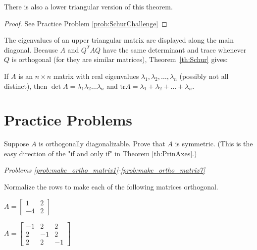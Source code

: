 \documentclass{ximera}
\begin{document}
\begin{remark}There is also a lower triangular version of this theorem.
\end{remark}

\begin{proof}
See Practice Problem \ref{prob:SchurChallenge}
\end{proof}

The eigenvalues of an upper triangular matrix are displayed along the main diagonal. Because $A$ and $Q^{T}AQ$ have the same determinant and trace whenever $Q$ is orthogonal (for they are similar matrices), Theorem~\ref{th:Schur} gives:

\begin{corollary}\label{cor:det_and_tr}
If $A$ is an $n \times n$ matrix with real eigenvalues $\lambda_{1}, \lambda_{2}, \dots, \lambda_{n}$ (possibly not all distinct), then $\det A = \lambda_{1}\lambda_{2} \dots \lambda_{n}$ and $\mbox{tr} A = \lambda_{1} + \lambda_{2} + \dots  + \lambda_{n}$.
\end{corollary}

\section*{Practice Problems}

\begin{problem}\label{prob:ortho_diag_implies_symmetric}
Suppose $A$ is orthogonally diagonalizable.  Prove that $A$ is symmetric.  (This is the easy direction of the "if and only if" in Theorem \ref{th:PrinAxes}.)
\end{problem}

\emph{Problems \ref{prob:make_ortho_matrix1}-\ref{prob:make_ortho_matrix7}}

Normalize the rows to make each of the following matrices orthogonal.


\begin{problem}\label{prob:make_ortho_matrix3}
$A = \begin{bmatrix}
1 & 2 \\
-4 & 2
\end{bmatrix}$
\end{problem}

\begin{problem}\label{prob:make_ortho_matrix7}
$A = \begin{bmatrix}
-1 & 2 & 2 \\
2 & -1 & 2 \\
2 & 2 & -1
\end{bmatrix}$
\end{problem}
\end{document}
